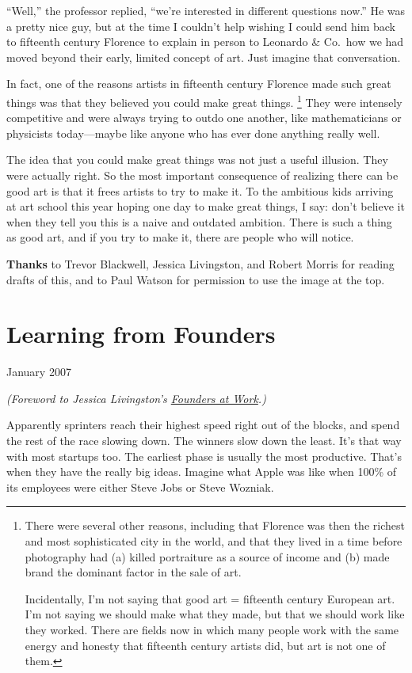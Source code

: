 \documentclass[12pt]{book}
\begin{document}
``Well,'' the professor replied, ``we're interested in different
questions now.'' He was a pretty nice guy, but at the time I couldn't
help wishing I could send him back to fifteenth century Florence to
explain in person to Leonardo \& Co.~how we had moved beyond their
early, limited concept of art. Just imagine that conversation.

In fact, one of the reasons artists in fifteenth century Florence made
such great things was that they believed you could make great things.
\footnote{There were several other reasons, including that Florence was
then the richest and most sophisticated city in the world, and that they
lived in a time before photography had (a) killed portraiture as a
source of income and (b) made brand the dominant factor in the sale of
art.

Incidentally, I'm not saying that good art = fifteenth century European
art. I'm not saying we should make what they made, but that we should
work like they worked. There are fields now in which many people work
with the same energy and honesty that fifteenth century artists did, but
art is not one of them.} They were intensely competitive and were
always trying to outdo one another, like mathematicians or physicists
today---maybe like anyone who has ever done anything really well.

The idea that you could make great things was not just a useful
illusion. They were actually right. So the most important consequence of
realizing there can be good art is that it frees artists to try to make
it. To the ambitious kids arriving at art school this year hoping one
day to make great things, I say: don't believe it when they tell you
this is a naive and outdated ambition. There is such a thing as good
art, and if you try to make it, there are people who will notice.


\textbf{Thanks} to Trevor Blackwell, Jessica Livingston, and Robert
Morris for reading drafts of this, and to Paul Watson for permission to
use the image at the top.
\chapter{Learning from Founders}

January 2007

\emph{(Foreword to Jessica Livingston's
\href{http://www.amazon.com/gp/product/1590597141}{Founders at Work}.)}

Apparently sprinters reach their highest speed right out of the blocks,
and spend the rest of the race slowing down. The winners slow down the
least. It's that way with most startups too. The earliest phase is
usually the most productive. That's when they have the really big ideas.
Imagine what Apple was like when 100\% of its employees were either
Steve Jobs or Steve Wozniak.
\end{document}
